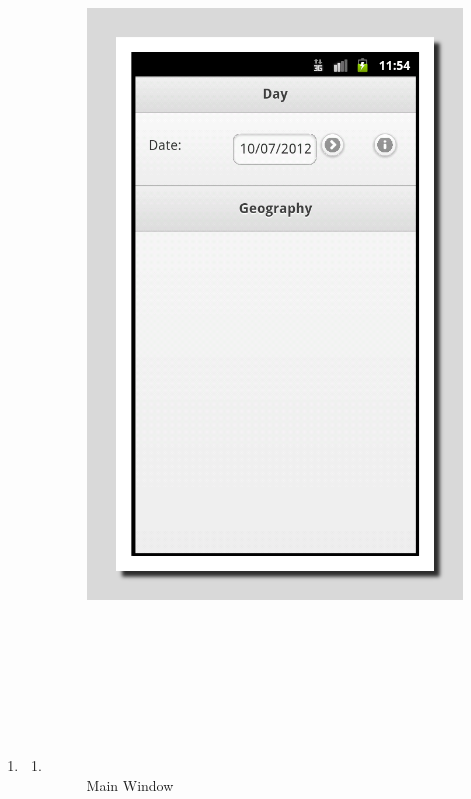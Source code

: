 \documentclass[a4paper]{article}
\begin{document}
\begin{enumerate}
\item \begin{enumerate}
\item[] \clearpage

\begin{figure}
\centering
\includegraphics[width=15.73cm,height=24.742cm]{PhoneGapProjectMSWLMemory-img/PhoneGapProjectMSWLMemory-img8.png}
\caption[Main Window]{Main Window}


\end{figure}
\end{enumerate}
\end{enumerate}
\end{document}
